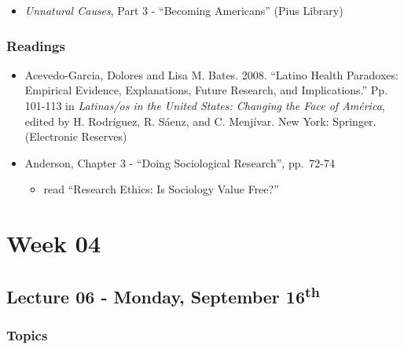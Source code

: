 \documentclass[]{book}
\providecommand{\tightlist}{%
  \setlength{\itemsep}{0pt}\setlength{\parskip}{0pt}}
\begin{document}
\begin{itemize}
\tightlist
\item
  \emph{Unnatural Causes}, Part 3 - ``Becoming Americans'' (Pius Library)
\end{itemize}

\hypertarget{readings-5}{%
\subsubsection*{Readings}\label{readings-5}}

\begin{itemize}
\tightlist
\item
  Acevedo-Garcia, Dolores and Lisa M. Bates. 2008. ``Latino Health Paradoxes: Empirical Evidence, Explanations, Future Research, and Implications.'' Pp. 101-113 in \emph{Latinas/os in the United States: Changing the Face of América}, edited by H. Rodríguez, R. Sáenz, and C. Menjívar. New York: Springer. (Electronic Reserves)
\item
  Anderson, Chapter 3 - ``Doing Sociological Research'', pp.~72-74

  \begin{itemize}
  \tightlist
  \item
    read ``Research Ethics: Is Sociology Value Free?''
  \end{itemize}
\end{itemize}

\hypertarget{week-04}{%
\section*{Week 04}\label{week-04}}

\hypertarget{lecture-06---monday-september-16th}{%
\subsection*{\texorpdfstring{Lecture 06 - Monday, September 16\textsuperscript{th}}{Lecture 06 - Monday, September 16th}}\label{lecture-06---monday-september-16th}}

\hypertarget{topics-6}{%
\subsubsection*{Topics}\label{topics-6}}
\end{document}
